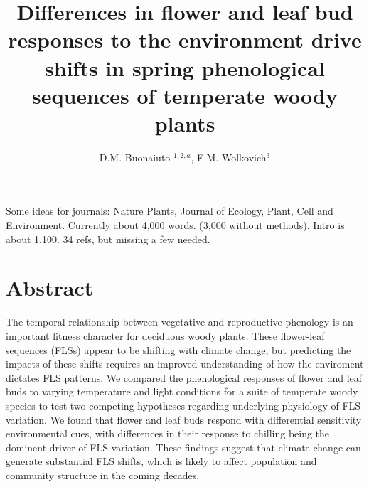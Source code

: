\documentclass[11pt]{article}
\title{Differences in flower and leaf bud responses to the environment drive shifts in spring phenological sequences of temperate woody plants}\\
\date{}
\author{D.M. Buonaiuto $^{1,2,a}$, E.M. Wolkovich$^{3}$}
\begin{document}
\maketitle

Some ideas for journals: Nature Plants, Journal of Ecology, Plant, Cell and Environment. Currently about 4,000 words. (3,000 without methods). Intro is about 1,100. 34 refs, but missing a few needed. \\
\section*{Abstract} %
The temporal relationship between vegetative and reproductive phenology is an important fitness character for deciduous woody plants. These flower-leaf sequences (FLSs) appear to be shifting with climate change, but predicting the impacts of these shifts requires an improved understanding of how the enviroment dictates FLS patterns. We compared the phenological responses of flower and leaf buds to varying temperature and light conditions for a suite of temperate woody species to test two competing hypotheses regarding underlying physiology of FLS variation. We found that flower and leaf buds respond with differential sensitivity environmental cues, with differences in their response to chilling being the dominent driver of FLS variation. These findings suggest that climate change can generate substantial FLS shifts, which is likely to affect population and community structure in the coming decades. %
\end{document}
